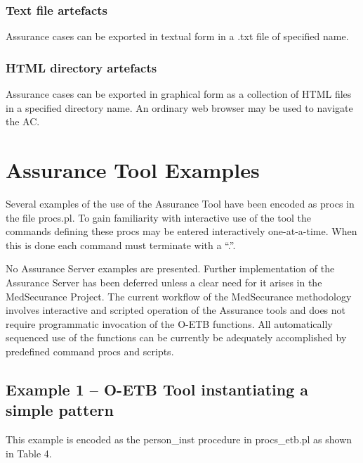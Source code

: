 \documentclass[12pt,twoside,a4paper]{article}
\begin{document}
\hypertarget{text-file-artefacts}{%
\subsubsection{Text file artefacts}\label{text-file-artefacts}}

Assurance cases can be exported in textual form in a .txt file of specified name.

\hypertarget{html-directory-artefacts}{%
\subsubsection{HTML directory artefacts}\label{html-directory-artefacts}}

Assurance cases can be exported in graphical form as a collection of HTML files in a specified directory name. An ordinary web browser may be used to navigate the AC.

\clearpage
\hypertarget{assurance-tool-examples}{%
\section{Assurance Tool Examples}\label{assurance-tool-examples}}

Several examples of the use of the Assurance Tool have been encoded as procs in the file procs.pl. To gain familiarity with interactive use of the tool the commands defining these procs may be entered interactively one-at-a-time. When this is done each command must terminate with a ``.''.

No Assurance Server examples are presented. Further implementation of the Assurance Server has been deferred unless a clear need for it arises in the MedSecurance Project. The current workflow of the MedSecurance methodology involves interactive and scripted operation of the Assurance tools and does not require programmatic invocation of the O-ETB functions. All automatically sequenced use of the functions can be currently be adequately accomplished by predefined command procs and scripts.

\hypertarget{example-1-o-etb-tool-instantiating-a-simple-pattern}{%
\subsection{Example 1 -- O-ETB Tool instantiating a simple pattern}\label{example-1-o-etb-tool-instantiating-a-simple-pattern}}

This example is encoded as the person\_inst procedure in procs\_etb.pl as shown in Table 4.
\end{document}
